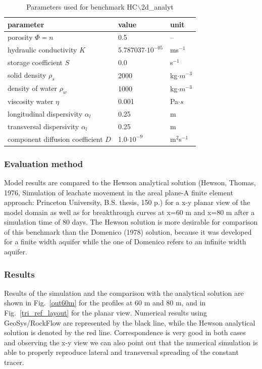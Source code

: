 \begin{table}[htbp]
\caption{Parameters used for benchmark HC$\backslash$2d\_analyt }
\centering
\begin{tabular}{|l|l|l|}
\hline
parameter & value & unit \\
\hline
porosity $\Phi = n $  & 0.5 &  --  \\			
\hline
hydraulic conductivity $K$ & 5.787037$\cdot 10^{-05}$ & ms$^{-1}$ \\
\hline
storage coefficient $S$ & 0.0 & s$^{-1}$ \\
\hline
solid density $\rho_s$ & 2000 &  kg$\cdot m^{-3}$ \\
\hline
density of water $\rho_w$ & 1000 & kg$\cdot m^{-3}$ \\
\hline
viscosity water $\eta$ & 0.001 & Pa$\cdot s$ \\
\hline
longitudinal dispersivity $\alpha_l$ & 0.25 & m \\
\hline
transversal dispersivity $\alpha_l$ & 0.25 & m \\
\hline
component diffusion coefficient $D$ & 1.0$\cdot 10^{-9}$ & m$^2$s$^{-1}$ \\
\hline
\end{tabular}
\label{l_tab_benchmark_1d}
\end{table}

\subsubsection*{Evaluation method}

Model results are compared to the Hewson analytical solution (Hewson, Thomas, 1976, Simulation of leachate movement in  the areal plane-A finite element approach: Princeton University, B.S. thesis, 150 p.) for a x-y planar view of the model domain as well as for breakthrough curves at x=60 m and x=80 m after a simulation time of 80 days.
The Hewson solution is more desirable for comparison of this benchmark than the Domenico (1978) solution, because it was developed for a finite width aquifer while the one of Domenico refers to an infinite width aquifer.

\subsubsection*{Results}

Results of the simulation and the comparison with the analytical solution are shown in Fig.~\ref{out60m} for the profiles at 60 m and 80 m, and in Fig.~\ref{tri_ref_layout} for the planar view. Numerical results using GeoSys/RockFlow are represented by the black line, while the Hewson analytical solution is denoted by the red line. Correspondence is very good in both cases and observing the x-y view we can also point out that the numerical simulation is able to properly reproduce lateral and transversal spreading of the constant tracer.

